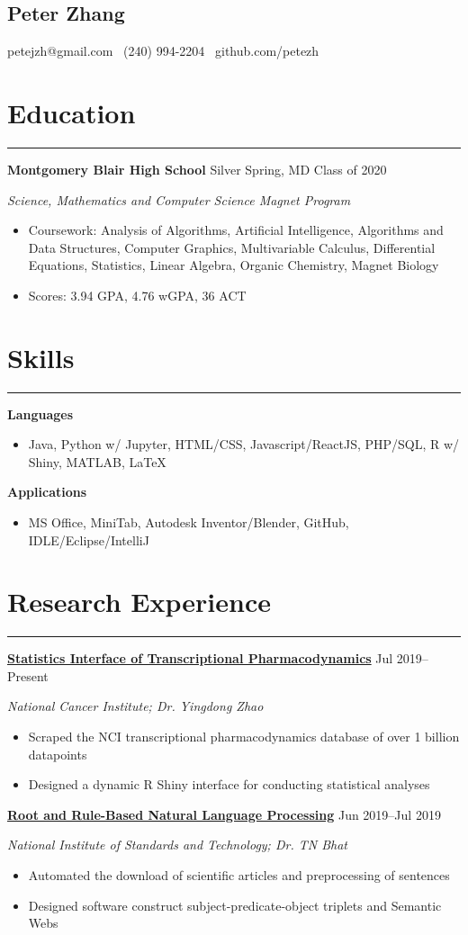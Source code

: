 \documentclass[11pt]{article}
\newcommand{\name}[1]{\begin{center}\section*{\huge \color{highlight} #1}\end{center}}
\newcommand{\topinfo}[1]{\begin{center}\vspace{-0.2cm}#1\vspace{-0.2cm}\end{center}}
\newcommand{\resumesection}[1]{\vspace{-0.3cm}\section*{\color{highlight}#1}\vspace{-0.3cm}\hrule\vspace{0.3cm}}
\begin{document}
\name{Peter Zhang}
\topinfo{petejzh@gmail.com \textbullet\ (240) 994-2204 \textbullet\ github.com/petezh}

\resumesection{Education}

\textbf{Montgomery Blair High School} Silver Spring, MD \hfill Class of 2020 \par
\textit{Science, Mathematics and Computer Science Magnet Program}

\begin{itemize}
	\item Coursework: Analysis of Algorithms, Artificial Intelligence, Algorithms and Data Structures, Computer Graphics, Multivariable Calculus, Differential Equations, Statistics, Linear Algebra, Organic Chemistry, Magnet Biology
	\item Scores: 3.94 GPA, 4.76 wGPA,  36 ACT
\end{itemize}


\resumesection{Skills}

\textbf{Languages}
\begin{itemize} 
	\item Java, Python w/ Jupyter, HTML/CSS, Javascript/ReactJS, PHP/SQL, R w/ Shiny, MATLAB, \LaTeX
\end{itemize}\vspace{0.1cm}

\textbf{Applications}
\begin{itemize} 
	\item MS Office, MiniTab, Autodesk Inventor/Blender, GitHub, IDLE/Eclipse/IntelliJ
\end{itemize}

\resumesection{Research Experience}

\textbf{\href{https://github.com/petezh/TP-Workbench}{Statistics Interface of Transcriptional Pharmacodynamics}} \hfill Jul 2019--Present \par
\textit{National Cancer Institute; Dr. Yingdong Zhao}
\begin{itemize}
	\item Scraped the NCI transcriptional pharmacodynamics database of over 1 billion datapoints
	\item Designed a dynamic R Shiny interface for conducting statistical analyses
\end{itemize}\vspace{0.1cm}

\textbf{\href{https://github.com/petezh/Root-and-Rule-NLP}{Root and Rule-Based Natural Language Processing}} \hfill Jun 2019--Jul 2019\par
\textit{National Institute of Standards and Technology; Dr. TN Bhat}
\begin{itemize}
	\item Automated the download of scientific articles and preprocessing of sentences
	\item Designed software construct subject-predicate-object triplets and Semantic Webs
\end{itemize}\vspace{0.1cm}
\end{document}
